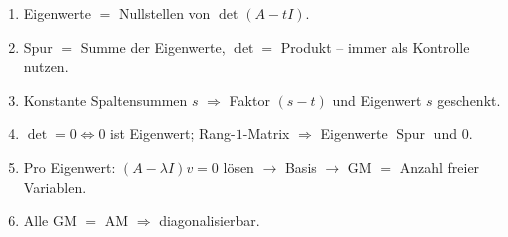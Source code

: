 \documentclass[a4paper,12pt]{article}
\begin{document}
\begin{merkbox}[title={Goldene Regeln}]
\begin{enumerate}[leftmargin=*, nosep]
    \item Eigenwerte $=$ Nullstellen von $\det(A - tI)$.
    \item Spur $=$ Summe der Eigenwerte, $\det =$ Produkt -- immer als Kontrolle nutzen.
    \item Konstante Spaltensummen $s$ $\Rightarrow$ Faktor $(s-t)$ und Eigenwert $s$ geschenkt.
    \item $\det = 0 \Leftrightarrow 0$ ist Eigenwert; Rang-$1$-Matrix $\Rightarrow$ Eigenwerte $\operatorname{Spur}$ und $0$.
    \item Pro Eigenwert: $(A - \lambda I)v = 0$ l\"osen $\to$ Basis $\to$ GM $=$ Anzahl freier Variablen.
    \item Alle GM $=$ AM $\Rightarrow$ diagonalisierbar.
\end{enumerate}
\end{merkbox}
\end{document}
